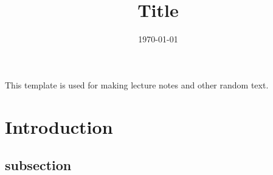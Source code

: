 \documentclass[11pt,a4paper]{article}
\title{ Title}
\author{ }
\date{\today}
\begin{document}
\maketitle

This template is used for making lecture notes and other random text.
\section{Introduction}
\subsection{subsection}


% 
% 
\end{document}

